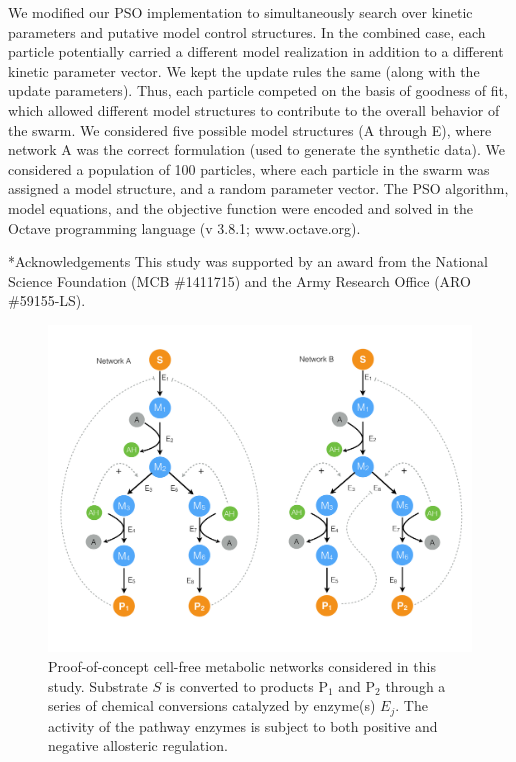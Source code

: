\documentclass[12pt]{article}
\makeatletter
\renewcommand\section{\@startsection
	{subsection}{2}{0mm}
	{-0.2in}
	{0.05\baselineskip}
	{\normalfont\large\bfseries}}
\makeatother
\begin{document}
We modified our PSO implementation to simultaneously search over kinetic parameters and putative model control structures.
In the combined case, each particle potentially carried a different model realization in addition to a different kinetic parameter vector. 
We kept the update rules the same (along with the update parameters). 
Thus, each particle competed on the basis of goodness of fit, which allowed different model structures to contribute to the overall behavior of the swarm. 
We considered five possible model structures (A through E), where network A was the correct formulation (used to generate the synthetic data). 
We considered a population of 100 particles, where each particle in the swarm was assigned a model structure, and a random parameter vector.
The PSO algorithm, model equations, and the objective function were encoded and solved in the Octave programming language (v 3.8.1; www.octave.org).

\section*{Acknowledgements}
This study was supported by an award from the National Science Foundation (MCB \#1411715) 
and the Army Research Office (ARO \#59155-LS).

\clearpage
%
%




\clearpage

\begin{figure}
\centering
\includegraphics[width=1.0\textwidth]{./figs/Figure-1-Networks.pdf}
\caption{Proof-of-concept cell-free metabolic networks considered in this study. Substrate $S$ is converted to products P$_{1}$ and P$_{2}$ through a series of chemical conversions
catalyzed by enzyme(s) $E_{j}$. The activity of the pathway enzymes is subject to both positive and negative allosteric regulation. }\label{fig-networks}
\end{figure}
\end{document}
